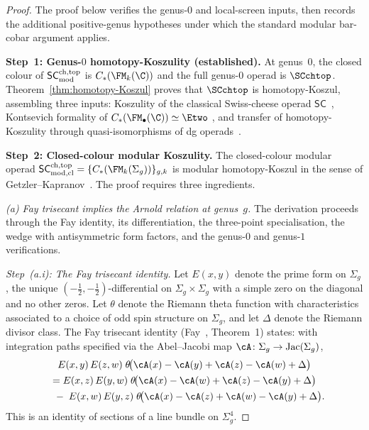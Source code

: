 \begin{proof}
The proof below verifies the genus-$0$ and local-screen inputs,
then records the additional positive-genus hypotheses under which
the standard modular bar-cobar argument applies.

\medskip\noindent
\textbf{Step~1: Genus-$0$ homotopy-Koszulity (established).}
At genus~$0$, the closed colour of $\mathsf{SC}^{\mathrm{ch,top}}_{\mathrm{mod}}$ is
$C_\ast(\FM_k(\C))$ and the full genus-$0$ operad is $\SCchtop$.
Theorem~\ref{thm:homotopy-Koszul} proves that $\SCchtop$ is
homotopy-Koszul, assembling three inputs: Koszulity of the
classical Swiss-cheese operad $\mathsf{SC}$~\cite{Hoe09,HL12},
Kontsevich formality of $C_\ast(\FM_\bullet(\C)) \simeq \Etwo$
\cite{Kon03}, and transfer of homotopy-Koszulity through
quasi-isomorphisms of dg operads~\cite{BM03,Val07}.

\medskip\noindent
\textbf{Step~2: Closed-colour modular Koszulity.}
The closed-colour modular operad
$\SCmodcl = \{C_\ast(\FM_k(\Sigma_g))\}_{g,k}$
is modular homotopy-Koszul in the sense of
Getzler--Kapranov~\cite{GK98}. The proof requires three
ingredients.

\medskip
\emph{(a) Fay trisecant implies the Arnold relation at genus~$g$.}
The derivation proceeds through the Fay identity,
its differentiation, the three-point specialisation, the wedge
with antisymmetric form factors, and the genus-$0$ and genus-$1$
verifications.

\medskip
\emph{Step~(a.i): The Fay trisecant identity.}
Let $E(x,y)$ denote the prime form on $\Sigma_g$, the
unique $(-\tfrac{1}{2}, -\tfrac{1}{2})$-differential on
$\Sigma_g \times \Sigma_g$ with a simple zero on the diagonal
and no other zeros. Let $\theta$ denote the Riemann theta
function with characteristics associated to a choice of
odd spin structure on $\Sigma_g$, and let $\Delta$ denote
the Riemann divisor class. The Fay trisecant identity
(Fay~\cite{Fay73}, Theorem~1) states: with integration paths
specified via the Abel--Jacobi map
$\cA \colon \Sigma_g \to \operatorname{Jac}(\Sigma_g)$,
\begin{multline}\label{eq:fay-trisecant}
 E(x,y)\, E(z,w)\;
 \theta\!\bigl(\cA(x) - \cA(y)
 + \cA(z) - \cA(w) + \Delta\bigr) \\
 = E(x,z)\, E(y,w)\;
 \theta\!\bigl(\cA(x) - \cA(w)
 + \cA(z) - \cA(y) + \Delta\bigr) \\
 \quad{}-\; E(x,w)\, E(y,z)\;
 \theta\!\bigl(\cA(x) - \cA(z)
 + \cA(w) - \cA(y) + \Delta\bigr).
\end{multline}
This is an identity of sections of a line bundle on
$\Sigma_g^4$.


\end{proof}

